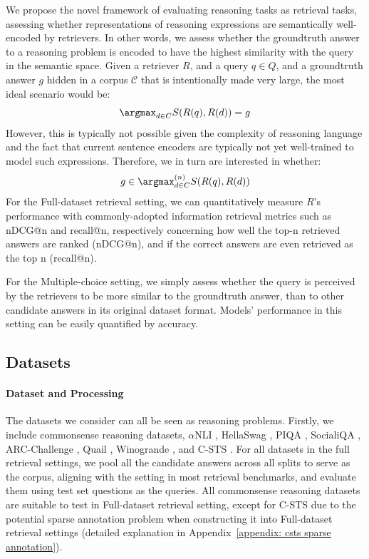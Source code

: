 \documentclass{article} %
\begin{document}
We propose the novel framework of evaluating reasoning tasks as retrieval tasks, assessing whether representations of reasoning expressions are semantically well-encoded by retrievers. In other words, we assess whether the groundtruth answer to a reasoning problem is encoded to have the highest similarity with the query in the semantic space. Given a retriever $R$, and a query $q \in Q$, and a groundtruth answer $g$ hidden in a corpus $\mathcal{C}$ that is intentionally made very large, the most ideal scenario would be:
\begin{equation} 
\argmax_{d \in C} S(R(q), R(d)) = g
\end{equation}
However, this is typically not possible given the complexity of reasoning language and the fact that current sentence encoders are typically not yet well-trained to model such expressions. Therefore, we in turn are interested in whether:
\begin{equation}  g \in \argmax\text{}^{(n)}_{d \in C} S(R(q), R(d))
\end{equation}
For the Full-dataset retrieval setting, we can quantitatively measure $R$'s performance with commonly-adopted information retrieval metrics such as nDCG@n and recall@n, respectively concerning how well the top-n retrieved answers are ranked (nDCG@n), and if the correct answers are even retrieved as the top n (recall@n).

For the Multiple-choice setting, we simply assess whether the query is perceived by the retrievers to be more similar to the groundtruth answer, than to other candidate answers in its original dataset format. Models' performance in this setting can be easily quantified by accuracy.

\subsection{Datasets}

\paragraph{Dataset and Processing}
The datasets we consider can all be seen as reasoning problems. Firstly, we include commonsense reasoning datasets, $\alpha$NLI \citep{bhagavatula2019abductive}, HellaSwag \citep{zellers2019hellaswag}, PIQA \citep{bisk2020piqa}, SocialiQA \citep{sap2019social}, ARC-Challenge \citep{clark2018think}, Quail \citep{rogers2020getting}, Winogrande \citep{sakaguchi2021winogrande}, and C-STS \citep{deshpande2023csts}. For all datasets in the full retrieval settings, we pool all the candidate answers across all splits to serve as the corpus, aligning with the setting in most retrieval benchmarks, and evaluate them using test set questions as the queries. All commonsense reasoning datasets are suitable to test in Full-dataset retrieval setting, except for C-STS \citep{deshpande2023csts} due to the potential sparse annotation problem when constructing it into Full-dataset retrieval settings \citep{thakur2021beir} (detailed explanation in Appendix~\ref{appendix: csts sparse annotation}).
\end{document}
